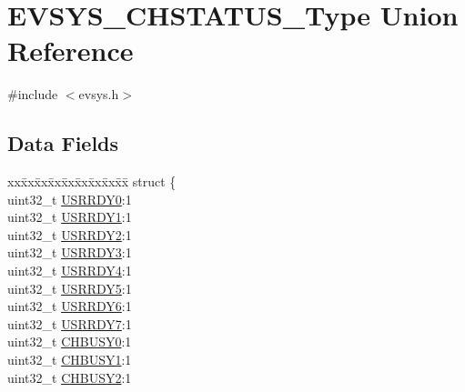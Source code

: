 \hypertarget{union_e_v_s_y_s___c_h_s_t_a_t_u_s___type}{}\section{E\+V\+S\+Y\+S\+\_\+\+C\+H\+S\+T\+A\+T\+U\+S\+\_\+\+Type Union Reference}
\label{union_e_v_s_y_s___c_h_s_t_a_t_u_s___type}


{\ttfamily \#include $<$evsys.\+h$>$}

\subsection*{Data Fields}
\begin{DoxyCompactItemize}
\item 
\begin{tabbing}
xx\=xx\=xx\=xx\=xx\=xx\=xx\=xx\=xx\=\kill
struct \{\\
\>uint32\_t \mbox{\hyperlink{union_e_v_s_y_s___c_h_s_t_a_t_u_s___type_ade24467637267a80a9201f39ad049ad4}{USRRDY0}}:1\\
\>uint32\_t \mbox{\hyperlink{union_e_v_s_y_s___c_h_s_t_a_t_u_s___type_aefd700fcc8ca6989f2db7eee15959209}{USRRDY1}}:1\\
\>uint32\_t \mbox{\hyperlink{union_e_v_s_y_s___c_h_s_t_a_t_u_s___type_ad71b8a2a76c6ef615e94948f4b923414}{USRRDY2}}:1\\
\>uint32\_t \mbox{\hyperlink{union_e_v_s_y_s___c_h_s_t_a_t_u_s___type_ac8a251c924ddfbffcfafca166a15c09a}{USRRDY3}}:1\\
\>uint32\_t \mbox{\hyperlink{union_e_v_s_y_s___c_h_s_t_a_t_u_s___type_a1527b809a0bddb35828248f2259121e4}{USRRDY4}}:1\\
\>uint32\_t \mbox{\hyperlink{union_e_v_s_y_s___c_h_s_t_a_t_u_s___type_a4830886110c8afb374cfcf6dc787e208}{USRRDY5}}:1\\
\>uint32\_t \mbox{\hyperlink{union_e_v_s_y_s___c_h_s_t_a_t_u_s___type_a2eb8162888f3fc747a427717b7c53b69}{USRRDY6}}:1\\
\>uint32\_t \mbox{\hyperlink{union_e_v_s_y_s___c_h_s_t_a_t_u_s___type_ad2fc1b2e81baf375217bc557dce7c0f5}{USRRDY7}}:1\\
\>uint32\_t \mbox{\hyperlink{union_e_v_s_y_s___c_h_s_t_a_t_u_s___type_af12ef5ced71c656175ea8ca8270cfdbc}{CHBUSY0}}:1\\
\>uint32\_t \mbox{\hyperlink{union_e_v_s_y_s___c_h_s_t_a_t_u_s___type_a73df30a3e5d5c03b4e84b6b03e753f78}{CHBUSY1}}:1\\
\>uint32\_t \mbox{\hyperlink{union_e_v_s_y_s___c_h_s_t_a_t_u_s___type_a96c36247188aa5689f581da8752341ce}{CHBUSY2}}:1\\

\end{tabbing}
\end{DoxyCompactItemize}

